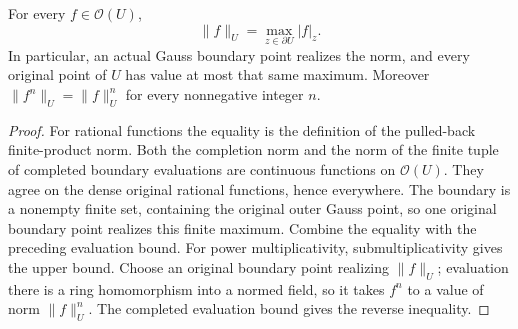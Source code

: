\begin{theorem}\label{thm:fc-completed-boundary-maximum}
\leanok
{}
For every $f\in\mathcal O(U)$,
\[
 \|f\|_U=\max_{z\in\partial U}|f|_z.
\]
In particular, an actual Gauss boundary point realizes the norm, and every
original point of $U$ has value at most that same maximum.
Moreover $\|f^n\|_U=\|f\|_U^n$ for every nonnegative integer $n$.
\end{theorem}
\begin{proof}
For rational functions the equality is the definition of the pulled-back
finite-product norm. Both the completion norm and the norm of the finite
tuple of completed boundary evaluations are continuous functions on
$\mathcal O(U)$. They agree on the dense original rational functions, hence
everywhere. The boundary is a nonempty finite set, containing the original
outer Gauss point, so one original boundary point realizes this finite
maximum. Combine the equality with the preceding evaluation bound.
For power multiplicativity, submultiplicativity gives the upper bound.
Choose an original boundary point realizing $\|f\|_U$; evaluation there is
a ring homomorphism into a normed field, so it takes $f^n$ to a value of
norm $\|f\|_U^n$. The completed evaluation bound gives the reverse inequality.
\end{proof}
